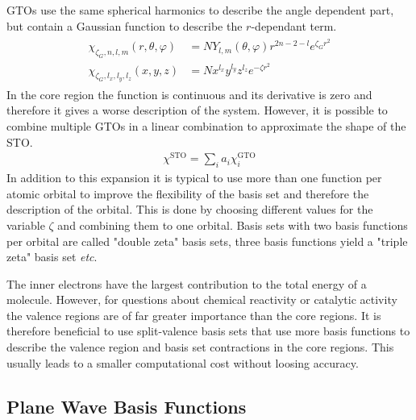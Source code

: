 \acp{GTO} use the same spherical harmonics to describe the angle dependent
part, but contain a Gaussian function to describe the $r$-dependant term.
%
\begin{align}
    \begin{aligned}
    \chi_{\zeta_G,n,l,m}(r,\theta,\varphi) &= NY_{l,m}(\theta,\varphi)r^{2n-2-l}e^{\zeta_Gr^2}\\
    \chi_{\zeta_G,l_x,l_y,l_z}(x,y,z) &= N x^{l_x}y^{l_y}z^{l_z}e^{-\zeta r^2}
    \end{aligned}
\end{align}
%
In the core region the function is continuous and its derivative is zero and
therefore it gives a worse description of the system. However, it is possible
to combine multiple \acp{GTO} in a linear combination to approximate the shape
of the \ac{STO}.
%
\begin{align}
    \chi^\text{STO} = \sum_ia_i\chi_i^\text{GTO}
\end{align}
%
In addition to this expansion it is typical to use more than one
function per atomic orbital to improve the flexibility of the basis set and
therefore the description of the orbital. This is done by choosing different
values for the variable $\zeta$ and combining them to one orbital. Basis sets
with two basis functions per orbital are called "double zeta" basis sets, three
basis functions yield a "triple zeta" basis set \textit{etc}.

The inner electrons have the largest contribution to the total energy of a
molecule. However, for questions about chemical reactivity or catalytic
activity the valence regions are of far greater importance than the core
regions. It is therefore beneficial to use split-valence basis sets that use
more basis functions to describe the valence region and basis set contractions
in the core regions. This usually leads to a smaller computational cost without
loosing accuracy. 

\subsection{Plane Wave Basis Functions}
\label{sec:PlaneWaveBasisFunctions}

